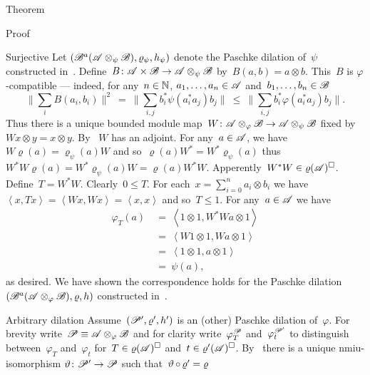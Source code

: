 \documentclass[b]{subfiles}
\begin{document}
\begin{parsec}
\begin{point}{Theorem}
\begin{point}{Proof}
\begin{point}{Surjective}
Let $(\mathscr{B}^a(\mathscr{A} \otimes_\psi \mathscr{B}),
    \varrho_\psi, h_\psi)$ denote the Paschke dilation of~$\psi$
    constructed in~.
Define~$B\colon \mathscr{A} \times \mathscr{B} \to \mathscr{A} \otimes_\psi \mathscr{B}$
    by~$B(a,b) = a \otimes b$.
This~$B$ is $\varphi$-compatible
--- indeed, for any~$n \in \mathbb{N}$, $a_1, \ldots, a_n \in \mathscr{A}$
    and~$b_1, \ldots, b_n \in \mathscr{B}$
\begin{equation*}
    \bigl\| \sum_i B(a_i, b_i) \bigr\|^2
     \ = \  \bigl\| \sum_{i,j}
                b_i^* \psi(a_i^*a_j) b_j \bigr\|
     \ \leq \  \bigl\| \sum_{i,j}
                b_i^* \varphi(a_i^*a_j) b_j \bigr\|.
\end{equation*}
Thus there is a unique bounded module
    map~$W \colon \mathscr{A} \otimes_\varphi \mathscr{B} \to \mathscr{A} \otimes_\psi \mathscr{B}$
    fixed by~$W x \otimes y = x \otimes y$.
By ~$W$ has an adjoint.
For any~$a\in\mathscr{A}$, we have~$W \varrho(a) = \varrho_\psi(a) W$
and so~$\varrho(a) W^* = W^* \varrho_\psi(a)$
thus~$W^*W \varrho(a) = W^* \varrho_\psi(a) W = \varrho(a) W^*W$.
Apperently~$W^*W \in \varrho(\mathscr{A})^\square$.
Define~$T = W^*W$. Clearly~$0\leq T$.
For each~$x = \sum^n_{i=0} a_i \otimes b_i$
    we have~$\left<x, Tx\right> = \left<Wx,Wx\right> = \left<x,x\right>$
    and so~$T \leq 1$.
For any~$a\in \mathscr{A}$ we have
\begin{align*}
    \varphi_T(a) &\ =\  \left<1\otimes 1, W^*W a \otimes 1\right> \\
    &  \ =\  \left<W 1\otimes 1, W a\otimes1\right> \\
    &  \ = \ \left<1\otimes1, a\otimes1\right> \\
    &  \ = \ \psi(a),
\end{align*}
    as desired.  We have shown the correspondence holds for
    the Paschke dilation~$(\mathscr{B}^a(\mathscr{A} \otimes_\varphi \mathscr{B}), \varrho, h)$
                constructed in~.
\end{point}
\begin{point}{Arbitrary dilation}%
Assume~$(\mathscr{P}', \varrho', h')$ is an (other) Paschke dilation
    of~$\varphi$.
For brevity write~$\mathscr{P} \equiv \mathscr{A} \otimes_\varphi \mathscr{B}$
    and for clarity
    write~$\varphi_T^{\mathscr{P}}$
        and~$\varphi_t^{\mathscr{P}'}$
    to distinguish between~$\varphi_T$ and~$\varphi_t$
    for~$T \in \varrho(\mathscr{A})^\square$ and~$t \in \varrho'(\mathscr{A})^\square$.
By~
    there is a unique nmiu-isomorphism
    $\vartheta\colon \mathscr{P}' \to \mathscr{P}$
    such that~$\vartheta \mathop{\circ} \varrho' = \varrho $

\end{point}
\end{point}
\end{point}
\end{parsec}
\end{document}
